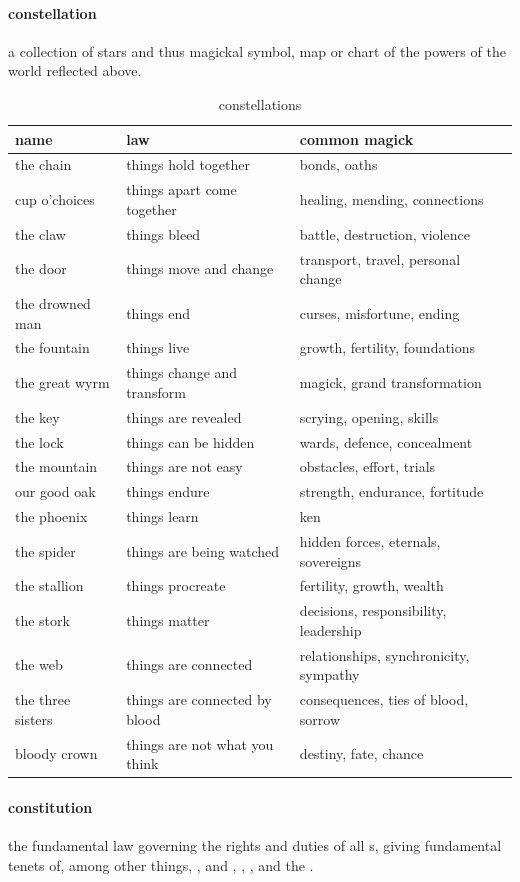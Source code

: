 \paragraph{constellation} a collection of stars and thus magickal symbol, map or chart of the powers of the world reflected above. \begin{table}\centering \begin{tabular}{lp{}p{}} name& law& common magick\\ \hline the chain & things hold together & bonds, oaths \\ cup o'choices & things apart come together & healing, mending, connections \\ the claw & things bleed & battle, destruction, violence \\ the door & things move and change & transport, travel, personal change \\ the drowned man & things end & curses, misfortune, ending \\ the fountain & things live & growth, fertility, foundations \\ the great wyrm & things change and transform & magick, grand transformation \\ the key & things are revealed & scrying, opening, skills \\ the lock & things can be hidden & wards, defence, concealment \\ the mountain & things are not easy & obstacles, effort, trials \\ our good oak & things endure & strength, endurance, fortitude \\ the phoenix & things learn & ken \\ the spider & things are being watched & hidden forces, eternals, sovereigns \\ the stallion & things procreate & fertility, growth, wealth \\ the stork & things matter & decisions, responsibility, leadership \\ the web & things are connected & relationships, synchronicity, sympathy \\ the three sisters & things are connected by blood & consequences, ties of blood, sorrow \\ bloody crown & things are not what you think & destiny, fate, chance \end{tabular} \caption{constellations} \end{table}
\paragraph{constitution} the fundamental law governing the rights and duties of all s, giving fundamental tenets of, among other things, ,  and , , ,  and the .

